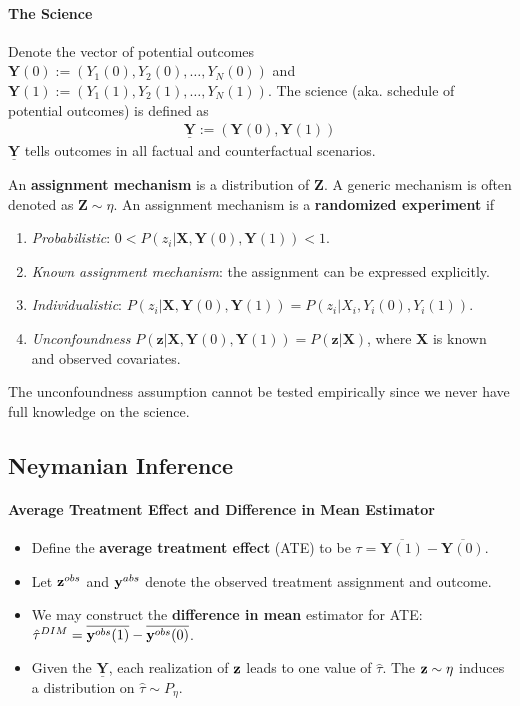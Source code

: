 \documentclass[11pt]{article}
\newcommand{\science}[0]{\underline{\textbf{Y}}}
\begin{document}
	\paragraph{The Science} Denote the vector of potential outcomes $\textbf{Y}(0) := (Y_1(0), Y_2(0), \dots, Y_N(0))$ and $\textbf{Y}(1) := (Y_1(1), Y_2(1), \dots, Y_N(1))$.
	The science (aka. schedule of potential outcomes) is defined as
	\begin{align}
		\science := (\textbf{Y}(0), \textbf{Y}(1))
	\end{align}
	$\science$ tells outcomes in all factual and counterfactual scenarios.
	
	\begin{definition}
		An \textbf{assignment mechanism} is a distribution of \textbf{Z}. A generic mechanism is often denoted as $\textbf{Z} \sim \eta$.
		An assignment mechanism is a \textbf{randomized experiment} if
		\begin{enumerate}
			\item \emph{Probabilistic}: $0 < P(z_i|\textbf{X}, \textbf{Y}(0), \textbf{Y}(1)) < 1$.
			\item \emph{Known assignment mechanism}: the assignment can be expressed explicitly.
			\item \emph{Individualistic}: $P(z_i|\textbf{X}, \textbf{Y}(0), \textbf{Y}(1)) = P(z_i|X_i, Y_i(0), Y_i(1))$.
			\item \emph{Unconfoundness} $P(\textbf{z}|\textbf{X}, \textbf{Y}(0), \textbf{Y}(1)) = P(\textbf{z}|\textbf{X})$, where \textbf{X} is known and observed covariates.
		\end{enumerate}
	\end{definition}
	
	\begin{remark}
		The unconfoundness assumption cannot be tested empirically since we never have full knowledge on the science.
	\end{remark}
	
	\subsection{Neymanian Inference}
	\paragraph{Average Treatment Effect and Difference in Mean Estimator} 
	\begin{itemize}
		\item Define the \textbf{average treatment effect} (ATE) to be $\tau = \overline{\textbf{Y}(1)} - \overline{\textbf{Y}(0)}$.
		\item Let $\textbf{z}^{obs}$ and $\textbf{y}^{abs}$ denote the observed treatment assignment and outcome.
		\item We may construct the \textbf{difference in mean} estimator for ATE: $\hat{\tau}^{DIM} = \overline{\textbf{y}^{obs}(1)} - \overline{\textbf{y}^{obs}(0)}$.
		\item Given the $\science$, each realization of $\textbf{z}$ leads to one value of $\hat{\tau}$. The $\textbf{z} \sim \eta$ induces a distribution on $\hat{\tau} \sim P_\eta$.
	\end{itemize}
	
\end{document}
